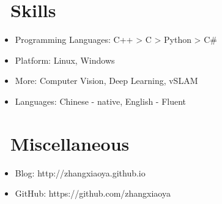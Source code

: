 \documentclass{resume}
\begin{document}
\section{\faCogs\ Skills}
\begin{itemize}[parsep=0.5ex]
  \item Programming Languages: C++ > C > Python > C\#
  \item Platform: Linux, Windows
  \item More: Computer Vision, Deep Learning, vSLAM
  \item Languages: Chinese - native, English - Fluent
\end{itemize}


\section{\faInfo\ Miscellaneous}
\begin{itemize}[parsep=0.5ex]
  \item Blog: http://zhangxiaoya.github.io
  \item GitHub: https://github.com/zhangxiaoya
\end{itemize}
\end{document}
